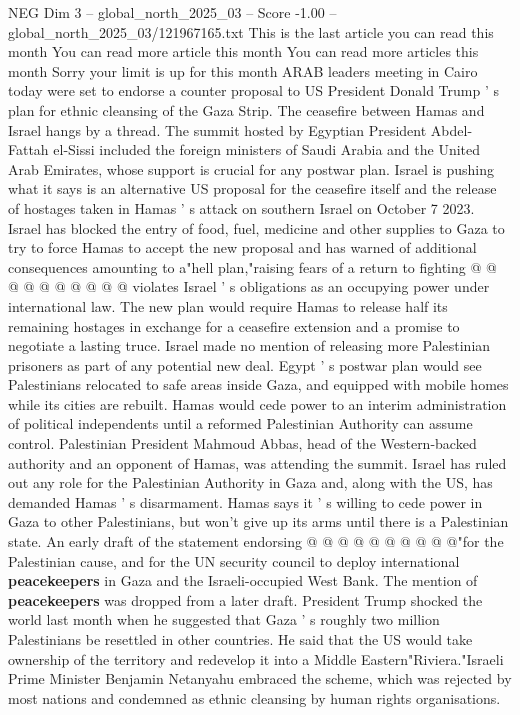 \begin{textsample}{NEG Dim 3 – global\_north\_2025\_03 – Score -1.00 – global\_north\_2025\_03/121967165.txt}  \label{ex:f3_neg_433}
This is the last article you can read this month You can read more article this month You can read more articles this month Sorry your limit is up for this month ARAB leaders meeting in Cairo today were set to endorse a counter proposal to US President Donald Trump ' s plan for ethnic cleansing of the Gaza Strip.
The ceasefire between Hamas and Israel hangs by a thread.
The summit hosted by Egyptian President Abdel-Fattah el-Sissi included the foreign ministers of Saudi Arabia and the United Arab Emirates, whose support is crucial for any postwar plan.
Israel is pushing what it says is an alternative US proposal for the ceasefire itself and the release of hostages taken in Hamas ' s attack on southern Israel on October 7 2023.
Israel has blocked the entry of food, fuel, medicine and other supplies to Gaza to try to force Hamas to accept the new proposal and has warned of additional consequences amounting to a"hell plan,"raising fears of a return to fighting @ @ @ @ @ @ @ @ @ @ violates Israel ' s obligations as an occupying power under international law.
The new plan would require Hamas to release half its remaining hostages in exchange for a ceasefire extension and a promise to negotiate a lasting truce.
Israel made no mention of releasing more Palestinian prisoners as part of any potential new deal.
Egypt ' s postwar plan would see Palestinians relocated to safe areas inside Gaza, and equipped with mobile homes while its cities are rebuilt.
Hamas would cede power to an interim administration of political independents until a reformed Palestinian Authority can assume control.
Palestinian President Mahmoud Abbas, head of the Western-backed authority and an opponent of Hamas, was attending the summit.
Israel has ruled out any role for the Palestinian Authority in Gaza and, along with the US, has demanded Hamas ' s disarmament.
Hamas says it ' s willing to cede power in Gaza to other Palestinians, but won't give up its arms until there is a Palestinian state.
An early draft of the statement endorsing @ @ @ @ @ @ @ @ @ @"for the Palestinian cause, and for the UN security council to deploy international \textbf{peacekeepers} in Gaza and the Israeli-occupied West Bank.
The mention of \textbf{peacekeepers} was dropped from a later draft.
President Trump shocked the world last month when he suggested that Gaza ' s roughly two million Palestinians be resettled in other countries.
He said that the US would take ownership of the territory and redevelop it into a Middle Eastern"Riviera."Israeli Prime Minister Benjamin Netanyahu embraced the scheme, which was rejected by most nations and condemned as ethnic cleansing by human rights organisations.

\end{textsample}
